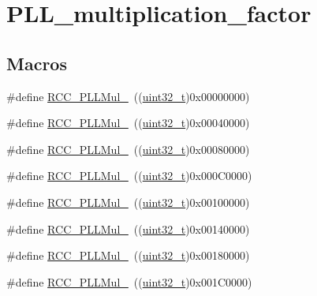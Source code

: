 \hypertarget{group___p_l_l__multiplication__factor}{}\section{P\+L\+L\+\_\+multiplication\+\_\+factor}
\label{group___p_l_l__multiplication__factor}
\subsection*{Macros}
\begin{DoxyCompactItemize}
\item 
\#define \hyperlink{group___p_l_l__multiplication__factor_ga91b3b28fa4d56693d1eb361e24f317af}{R\+C\+C\+\_\+\+P\+L\+L\+Mul\+\_}~((\hyperlink{_p_e___types_8h_a33594304e786b158f3fb30289278f5af}{uint32\+\_\+t})0x00000000)
\item 
\#define \hyperlink{group___p_l_l__multiplication__factor_gafc2dd6c503b9ee6e0cfbec6d7d3a3e00}{R\+C\+C\+\_\+\+P\+L\+L\+Mul\+\_}~((\hyperlink{_p_e___types_8h_a33594304e786b158f3fb30289278f5af}{uint32\+\_\+t})0x00040000)
\item 
\#define \hyperlink{group___p_l_l__multiplication__factor_ga897be2cbbdabb6035bfe9bd515d6897f}{R\+C\+C\+\_\+\+P\+L\+L\+Mul\+\_}~((\hyperlink{_p_e___types_8h_a33594304e786b158f3fb30289278f5af}{uint32\+\_\+t})0x00080000)
\item 
\#define \hyperlink{group___p_l_l__multiplication__factor_gad45e4f8edbbf4d49ded913e83e3a2d06}{R\+C\+C\+\_\+\+P\+L\+L\+Mul\+\_}~((\hyperlink{_p_e___types_8h_a33594304e786b158f3fb30289278f5af}{uint32\+\_\+t})0x000\+C0000)
\item 
\#define \hyperlink{group___p_l_l__multiplication__factor_ga2eea74b9955e556b302f4d446dd68eb4}{R\+C\+C\+\_\+\+P\+L\+L\+Mul\+\_}~((\hyperlink{_p_e___types_8h_a33594304e786b158f3fb30289278f5af}{uint32\+\_\+t})0x00100000)
\item 
\#define \hyperlink{group___p_l_l__multiplication__factor_ga1c307e520d53fa21bc60efcb71c03e01}{R\+C\+C\+\_\+\+P\+L\+L\+Mul\+\_}~((\hyperlink{_p_e___types_8h_a33594304e786b158f3fb30289278f5af}{uint32\+\_\+t})0x00140000)
\item 
\#define \hyperlink{group___p_l_l__multiplication__factor_ga8c1f1c5fe591f062078acf603bfbfb06}{R\+C\+C\+\_\+\+P\+L\+L\+Mul\+\_}~((\hyperlink{_p_e___types_8h_a33594304e786b158f3fb30289278f5af}{uint32\+\_\+t})0x00180000)
\item 
\#define \hyperlink{group___p_l_l__multiplication__factor_ga984bc5a117e3c6066e2fc7b29a0affda}{R\+C\+C\+\_\+\+P\+L\+L\+Mul\+\_}~((\hyperlink{_p_e___types_8h_a33594304e786b158f3fb30289278f5af}{uint32\+\_\+t})0x001\+C0000)

\end{DoxyCompactItemize}
